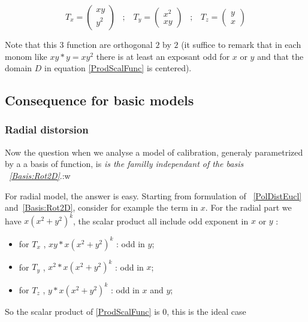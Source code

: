 \begin{equation}
	T_x= \begin{pmatrix}   xy  \\  y^2  \end{pmatrix}
\;\;\;  ; \;\;\;  
	T_y =\begin{pmatrix}   x^2 \\  xy   \end{pmatrix}
\;\;\;  ; \;\;\;  
	T_z = \begin{pmatrix}   y   \\  x \end{pmatrix}
		\label{Basis:Rot2D}
\end{equation}

Note that this $3$ function are orthogonal $2$ by $2$ (it suffice to remark
that in each monom like $xy * y= xy^2$ there is at least an exposant odd for $x$ or $y$ and that
the domain $D$ in equation \ref{ProdScalFunc} is centered).


\subsection{Consequence for basic models}

\subsubsection{Radial distorsion}

Now the question when we analyse a model of calibration, generaly parametrized by a
a basis of function, is \emph{is the familly independant of the basis ~\ref{Basis:Rot2D}}.:w

For radial model, the answer is easy. Starting from formulation of ~\ref{PolDistEucl}
and~\ref{Basis:Rot2D}, consider for example the term in $x$. For the radial part
we have $x (x^2+y^2)^k$, the scalar product all include odd exponent in $x$ or $y$ :

\begin{itemize}
	\item for $T_x$ ,  $x y * x (x^2+y^2)^k$  : odd in $y$;
	\item for $T_y$ ,  $x^2 * x (x^2+y^2)^k$  : odd in $x$;
	\item for $T_z$ ,  $y  * x  (x^2+y^2)^k$  : odd in $x$ and $y$;
\end{itemize}

So the scalar product of \ref{ProdScalFunc} is $0$, this is the ideal case 


